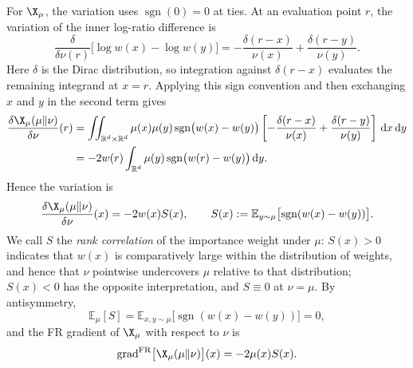 \documentclass{article}
\begin{document}
For $\X_\mu$, the variation uses $\operatorname{sgn}(0)=0$ at ties. At an evaluation point $r$, the variation of the inner log-ratio difference is
\begin{equation*}
    \frac{\delta}{\delta\nu(r)}
    \bigl[\log w(x)-\log w(y)\bigr]
    =-\frac{\delta(r-x)}{\nu(x)}
    +\frac{\delta(r-y)}{\nu(y)}.
\end{equation*}
Here $\delta$ is the Dirac distribution, so integration against $\delta(r-x)$ evaluates the remaining integrand at $x=r$.
Applying this sign convention and then exchanging $x$ and $y$ in the second term gives
\begin{align*}
    \frac{\delta \X_\mu(\mu\|\nu)}{\delta \nu}(r)
    & = \iint_{\mathbb R^d\times\mathbb R^d}
    \mu(x)\mu(y)\operatorname{sgn}\bigl(w(x)-w(y)\bigr)
    \left[-\frac{\delta(r-x)}{\nu(x)}
    +\frac{\delta(r-y)}{\nu(y)}\right]\D x\D y \\
    & = -2w(r)\int_{\mathbb R^d}
    \mu(y)\operatorname{sgn}\bigl(w(r)-w(y)\bigr)\D y.
\end{align*}
Hence the variation is
\begin{equation}
    \frac{\delta \X_\mu(\mu\|\nu)}{\delta \nu}(x) = - 2w(x)S(x),
    \qquad
    S(x) := \mathbb E_{y\sim\mu}\bigl[\operatorname{sgn}(w(x) - w(y))\bigr].
    \label{eq: appendix-var-X}
\end{equation}
We call $S$ the \emph{rank correlation} of the importance weight under $\mu$: $S(x) > 0$ indicates that $w(x)$ is comparatively large within the distribution of weights, and hence that $\nu$ pointwise undercovers $\mu$ relative to that distribution; $S(x) < 0$ has the opposite interpretation, and $S \equiv 0$ at $\nu = \mu$. By antisymmetry,
\begin{equation*}
    \mathbb E_\mu[S] = \mathbb E_{x,y\sim \mu}\bigl[\operatorname{sgn}(w(x) - w(y))\bigr] = 0,
\end{equation*}
and the FR gradient of $\X_\mu$ with respect to $\nu$ is
\begin{equation}
    \mathrm{grad}^{\mathrm{FR}}\big[\X_\mu(\mu\|\nu)\big](x) = -2\mu(x) S(x).
    \label{eq: appendix-FR-grad-X}
\end{equation}
\end{document}
